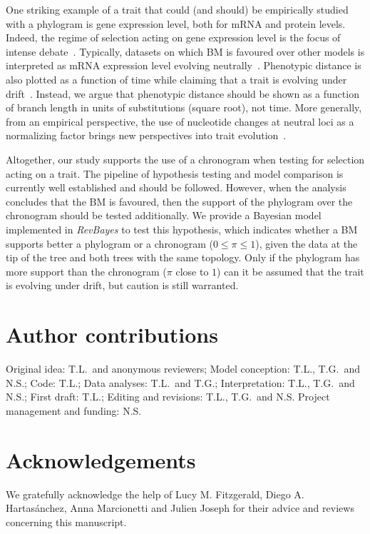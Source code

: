 \documentclass{article}
\newcommand{\PhyloSupport}{\pi}
\begin{document}
One striking example of a trait that could (and should) be empirically studied with a phylogram is gene expression level, both for mRNA and protein levels.
Indeed, the regime of selection acting on gene expression level is the focus of intense debate~\citep{signor_evolution_2018, price_detecting_2022, bertram_cagee_2023, dimayacyac_evaluating_2023}.
Typically, datasets on which BM is favoured over other models is interpreted as mRNA expression level evolving neutrally~\citep{khaitovich_evolution_2006, catalan_drift_2019, dimayacyac_evaluating_2023}.
Phenotypic distance is also plotted as a function of time while claiming that a trait is evolving under drift~\citep{jiang_decoupling_2023}.
Instead, we argue that phenotypic distance should be shown as a function of branch length in units of substitutions (square root), not time.
More generally, from an empirical perspective, the use of nucleotide changes at neutral loci as a normalizing factor brings new perspectives into trait evolution~\citep{latrille_detecting_2024}.

Altogether, our study supports the use of a chronogram when testing for selection acting on a trait.
The pipeline of hypothesis testing and model comparison is currently well established and should be followed.
However, when the analysis concludes that the BM is favoured, then the support of the phylogram over the chronogram should be tested additionally.
We provide a Bayesian model implemented in \textit{RevBayes} to test this hypothesis, which indicates whether a BM supports better a phylogram or a chronogram ($0 \leq \PhyloSupport \leq 1$), given the data at the tip of the tree and both trees with the same topology.
Only if the phylogram has more support than the chronogram ($\PhyloSupport$ close to $1$) can it be assumed that the trait is evolving under drift, but caution is still warranted.


\section*{Author contributions}
Original idea: T.L.\ and anonymous reviewers;
Model conception: T.L., T.G.\ and N.S.;
Code: T.L.;
Data analyses: T.L.\ and T.G.;
Interpretation: T.L., T.G.\ and N.S.;
First draft: T.L.;
Editing and revisions: T.L., T.G.\ and N.S.
Project management and funding: N.S\@.

\section*{Acknowledgements}
\label{sec:acknowledgment}
We gratefully acknowledge the help of Lucy M. Fitzgerald, Diego A. Hartasánchez, Anna Marcionetti and Julien Joseph for their advice and reviews concerning this manuscript.
\end{document}
